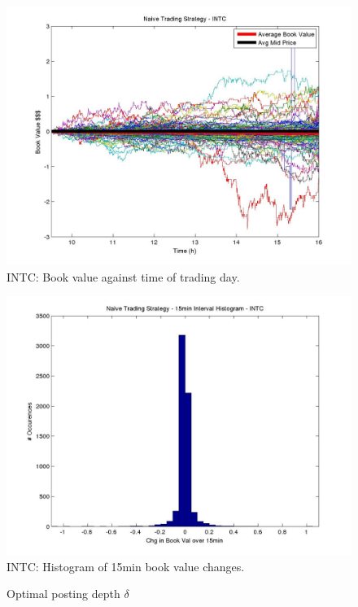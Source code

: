 \begin{figure}
  \includegraphics[width=\textwidth]{Figs/fig-INTC-year-bookvals}
  \caption{INTC: Book value against time of trading day.}
\end{figure}

\begin{figure}
  \includegraphics[width=\textwidth]{Figs/fig-INTC-15min-hist}
  \caption{INTC: Histogram of 15min book value changes.}
\end{figure}

\begin{figure}
  \centering
  \setlength{} 
  \setlength{}
  
  \caption{Optimal posting depth $\delta$}
  \label{fig:126a}
\end{figure}

